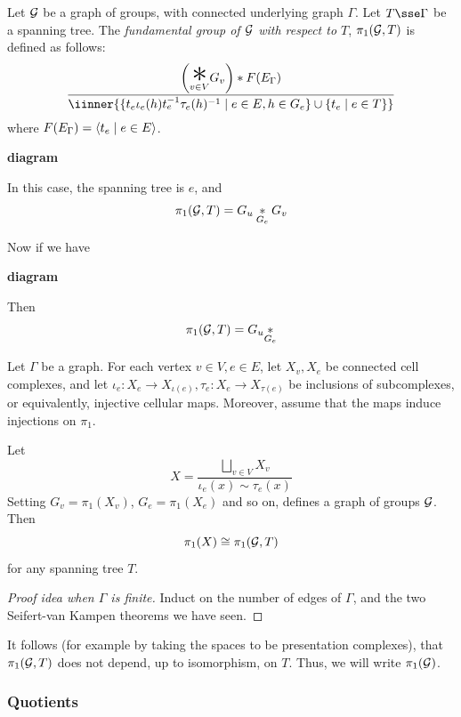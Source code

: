\documentclass{article}
\renewcommand{\bigstar}{\mathop{\Huge \mathlarger{\mathlarger{*}}}}
\begin{document}
\begin{definition}
    Let \(\mathcal{G}\) be a graph of groups, with connected underlying graph \(\Gamma\). Let \(T \sse \Gamma\) be a spanning tree. The \emph{fundamental group of \(\mathcal{G}\) with respect to \(T\)}, \(\pi_1(\mathcal{G}, T)\) is defined as follows:
    \[\frac{\left(\underset{v \in V}{\bigstar}G_v\right) * F(E_\Gamma)}{\iinner{\{t_e\iota_e(h)t_e^{-1}\tau_e(h)^{-1} \mid e \in E, h \in G_e\} \cup \{t_e \mid e \in T\}}}\]
    where \(F(E_\Gamma)  =\left\langle t_e \mid e \in E \right\rangle\).
\end{definition}

\begin{example}
    \textbf{diagram}

    In this case, the spanning tree is \(e\), and
    \[\pi_1(\mathcal{G}, T) = G_u \underset{G_e}* G_v\]

    Now if we have
    
    \textbf{diagram}

    Then
    \[\pi_1(\mathcal{G}, T) = G_u \underset{G_e}*\]
\end{example}

\begin{theorem}
     Let \(\Gamma\) be a graph. For each vertex \(v \in V, e \in E\), let \(X_v, X_e\) be connected cell complexes, and let \(\iota_e : X_e \to X_{\iota(e)}, \tau_e : X_e \to X_{\tau(e)}\) be inclusions of subcomplexes, or equivalently, injective cellular maps. Moreover, assume that the maps induce injections on \(\pi_1\).

    Let
    \[X = \frac{\bigsqcup_{v \in V}X_v}{\iota_e(x) \sim \tau_e(x)}\]
    Setting \(G_v = \pi_1(X_v)\), \(G_e = \pi_1(X_e)\) and so on, defines a graph of groups \(\mathcal{G}\). Then
    \[\pi_1(X) \cong \pi_1(\mathcal{G}, T)\]
    for any spanning tree \(T\).
\end{theorem}

\begin{proof}
    [Proof idea when \(\Gamma\) is finite] Induct on the number of edges of \(\Gamma\), and the two Seifert-van Kampen theorems we have seen.
\end{proof}

\begin{remark}
    It follows (for example by taking the spaces to be presentation complexes), that \(\pi_1(\mathcal{G}, T)\) does not depend, up to isomorphism, on \(T\). Thus, we will write \(\pi_1(\mathcal{G})\).
\end{remark}

\subsubsection{Quotients}
\end{document}
